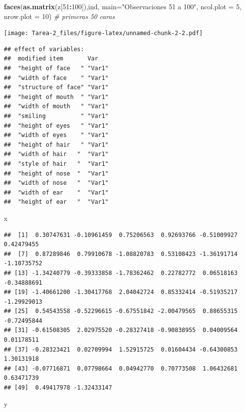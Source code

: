\documentclass[
]{article}
\newenvironment{Shaded}{\begin{snugshade}}{\end{snugshade}}
\newcommand{\CommentTok}[1]{\textcolor[rgb]{0.56,0.35,0.01}{\textit{#1}}}
\newcommand{\DataTypeTok}[1]{\textcolor[rgb]{0.13,0.29,0.53}{#1}}
\newcommand{\DecValTok}[1]{\textcolor[rgb]{0.00,0.00,0.81}{#1}}
\newcommand{\KeywordTok}[1]{\textcolor[rgb]{0.13,0.29,0.53}{\textbf{#1}}}
\newcommand{\NormalTok}[1]{#1}
\newcommand{\OperatorTok}[1]{\textcolor[rgb]{0.81,0.36,0.00}{\textbf{#1}}}
\newcommand{\StringTok}[1]{\textcolor[rgb]{0.31,0.60,0.02}{#1}}
\begin{document}
\begin{Shaded}
\begin{Highlighting}[]
  \KeywordTok{faces}\NormalTok{(}\KeywordTok{as.matrix}\NormalTok{(z[}\DecValTok{51}\OperatorTok{:}\DecValTok{100}\NormalTok{]),ind, }\DataTypeTok{main=}\StringTok{"Observaciones 51 a 100"}\NormalTok{, }\DataTypeTok{ncol.plot =} \DecValTok{5}\NormalTok{, }\DataTypeTok{nrow.plot =} \DecValTok{10}\NormalTok{) }\CommentTok{# primeras 50 caras}
\end{Highlighting}
\end{Shaded}

\texttt{[image: Tarea-2\_files/figure-latex/unnamed-chunk-2-2.pdf]}

\begin{verbatim}
## effect of variables:
##  modified item       Var   
##  "height of face   " "Var1"
##  "width of face    " "Var1"
##  "structure of face" "Var1"
##  "height of mouth  " "Var1"
##  "width of mouth   " "Var1"
##  "smiling          " "Var1"
##  "height of eyes   " "Var1"
##  "width of eyes    " "Var1"
##  "height of hair   " "Var1"
##  "width of hair   "  "Var1"
##  "style of hair   "  "Var1"
##  "height of nose  "  "Var1"
##  "width of nose   "  "Var1"
##  "width of ear    "  "Var1"
##  "height of ear   "  "Var1"
\end{verbatim}

\begin{Shaded}
\begin{Highlighting}[]
\NormalTok{  x}
\end{Highlighting}
\end{Shaded}

\begin{verbatim}
##  [1]  0.30747631 -0.10961459  0.75206563  0.92693766 -0.51009927  0.42479455
##  [7]  0.87289846  0.79910678 -1.08820783  0.53108423 -1.36191714 -1.10735752
## [13] -1.34240779 -0.39333858 -1.78362462  0.22782772  0.06518163 -0.34888691
## [19] -1.40661200 -1.30417768  2.04042724  0.85332414 -0.51935217 -1.29929013
## [25]  0.54543558 -0.52296615 -0.67551842 -2.00479565  0.88655315 -0.72495844
## [31] -0.61508305  2.02975520 -0.28327418 -0.90838955  0.04009564  0.01178511
## [37] -0.28323421  0.02709994  1.52915725  0.01604434 -0.64300853  1.30131918
## [43] -0.07716871  0.07798664  0.04942770  0.70773508  1.06432681  0.63471739
## [49]  0.49417978 -1.32433147
\end{verbatim}

\begin{Shaded}
\begin{Highlighting}[]
\NormalTok{  y}
\end{Highlighting}
\end{Shaded}
\end{document}
